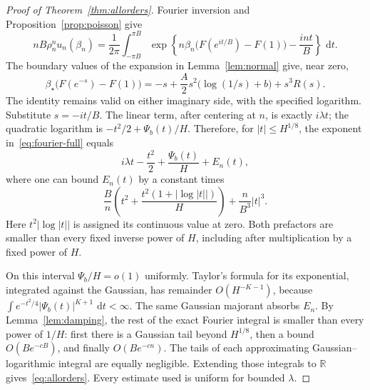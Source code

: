 \documentclass[11pt,a4paper]{article}
\numberwithin{equation}{section}
\theoremstyle{definition}
\theoremstyle{remark}
\newcommand{\R}{\mathbb R}
\newcommand{\dd}{\,\mathrm d}
\newcommand{\bs}{\beta_\star}
\begin{document}
\begin{proof}[Proof of Theorem~\ref{thm:allorders}]
Fourier inversion and Proposition~\ref{prop:poisson} give
\begin{equation}
 nB\rho_n^n u_n(\beta_n)=\frac{1}{2\pi}
 \int_{-\pi B}^{\pi B}
 \exp\left\{n\beta_n\bigl(F(e^{it/B})-F(1)\bigr)-\frac{int}{B}\right\}
 \,\dd t.
 \label{eq:fourier-full}
\end{equation}
The boundary values of the expansion in Lemma~\ref{lem:normal} give, near
zero,
\[
 \bs\bigl(F(e^{-s})-F(1)\bigr)
 =-s+\frac A2s^2\bigl(\log(1/s)+b\bigr)+s^3R(s).
\]
The identity remains valid on either imaginary side, with the specified
logarithm. Substitute \(s=-it/B\). The linear term, after centering at
\(n\), is exactly \(i\lambda t\); the quadratic logarithm is
\(-t^2/2+\Psi_b(t)/H\). Therefore, for \(|t|\le H^{1/8}\), the exponent
in~\eqref{eq:fourier-full} equals
\begin{equation}
 i\lambda t-\frac{t^2}{2}+\frac{\Psi_b(t)}{H}+E_n(t),
 \label{eq:fourier-exponent}
\end{equation}
where one can bound \(E_n(t)\) by a constant times
\[
 \frac Bn\left(t^2+\frac{t^2(1+|\log|t||)}{H}\right)
 +\frac{n}{B^3}|t|^3.
\]
Here \(t^2|\log|t||\) is assigned its continuous value at zero.
Both prefactors are smaller than every fixed inverse power of \(H\),
including after multiplication by a fixed power of \(H\).

On this interval \(\Psi_b/H=o(1)\) uniformly. Taylor's formula for its
exponential, integrated against the Gaussian, has remainder
\(O(H^{-K-1})\), because
\(\int e^{-t^2/4}|\Psi_b(t)|^{K+1}\,\dd t<\infty\).
The same Gaussian majorant absorbs \(E_n\). By
Lemma~\ref{lem:damping}, the rest of the exact Fourier integral is smaller
than every power of \(1/H\): first there is a Gaussian tail beyond
\(H^{1/8}\), then a bound \(O(B e^{-cB})\), and finally
\(O(B e^{-cn})\). The tails of each approximating Gaussian--logarithmic
integral are equally negligible. Extending those integrals to \(\R\)
gives~\eqref{eq:allorders}. Every estimate used is uniform for bounded
\(\lambda\).
\end{proof}
\end{document}
